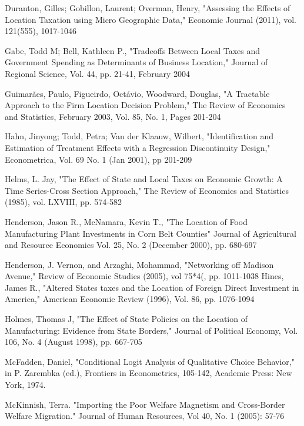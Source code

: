 \documentclass[12pt,a4paper]{article}
\begin{document}
\begin{thebibliography}{99}
Duranton, Gilles; Gobillon, Laurent; Overman, Henry, "Assessing the Effects of Location Taxation using Micro Geographic Data," Economic Journal (2011), vol. 121(555), 1017-1046


Gabe, Todd M; Bell, Kathleen P., "Tradeoffs Between Local Taxes and Government Spending as Determinants of Business Location," Journal of Regional Science, Vol. 44, pp. 21-41, February 2004 

Guimarães, Paulo, Figueirdo, Octávio, Woodward, Douglas, "A Tractable Approach to the Firm Location Decision Problem," The Review of Economics and Statistics, February 2003, Vol. 85, No. 1, Pages 201-204

Hahn, Jinyong; Todd, Petra; Van der Klaauw, Wilbert, "Identification and Estimation of Treatment Effects with a Regression Discontinuity Design," Econometrica, Vol. 69 No. 1 (Jan 2001), pp 201-209

Helms, L. Jay, "The Effect of State and Local Taxes on Economic Growth: A Time Series-Cross Section Approach," The Review of Economics and Statistics (1985), vol. LXVIII, pp. 574-582

Henderson, Jason R., McNamara, Kevin T., "The Location of Food Manufacturing Plant Investments in Corn Belt Counties" Journal of Agricultural and Resource Economics
Vol. 25, No. 2 (December 2000), pp. 680-697 

Henderson, J. Vernon, and Arzaghi, Mohammad, "Networking off Madison Avenue," Review of Economic Studies (2005), vol 75*4(, pp. 1011-1038
Hines, James R., "Altered States taxes and the Location of Foreign Direct Investment in America," American Economic Review (1996), Vol. 86, pp. 1076-1094

Holmes, Thomas J, "The Effect of State Policies on the Location of Manufacturing: Evidence from State Borders," Journal of Political Economy, Vol. 106, No. 4 (August 1998), pp. 667-705

McFadden, Daniel, "Conditional Logit Analysis of Qualitative Choice Behavior," in P. Zarembka (ed.), Frontiers in Econometrics, 105-142, Academic Press: New York, 1974.

McKinnish, Terra. "Importing the Poor Welfare Magnetism and Cross-Border Welfare Migration." Journal of Human Resources, Vol 40, No. 1 (2005): 57-76


\end{thebibliography}
\end{document}
